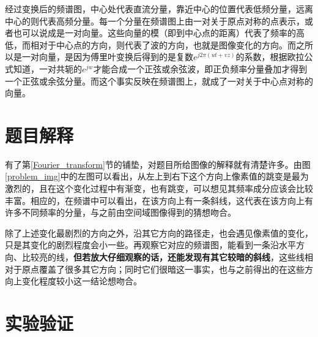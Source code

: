 \documentclass[UTF8]{ctexart}
\begin{document}
			 \indent 经过变换后的频谱图，中心处代表直流分量，靠近中心的位置代表低频分量，远离中心的则代表高频分量。每一个分量在频谱图上由一对关于原点对称的点表示，或者也可以说成是一对向量。这些向量的模（即到中心点的距离）代表了频率的高低，而相对于中心点的方向，则代表了波的方向，也就是图像变化的方向。而之所以是一对向量，是因为傅里叶变换后得到的是复数$e^{j2\pi(ut+vz)}$的系数，根据欧拉公式知道，一对共轭的$e^{jw}$才能合成一个正弦或余弦波，即正负频率分量叠加才得到一个正弦或余弦分量。而这个事实反映在频谱图上，就成了一对关于中心点对称的向量。



		
	\section{题目解释}\label{explanation}
		\indent 有了第\ref{Fourier_transform}节的铺垫，对题目所给图像的解释就有清楚许多。由图\ref{problem_img}中的左图可以看出，从左上到右下这个方向上像素值的跳变是最为激烈的，且在这个变化过程中有渐变，也有跳变，可以想见其频率成分应该会比较丰富。相应的，在频谱中可以看出，在该方向上有一条斜线，这代表在该方向上有许多不同频率的分量，与之前由空间域图像得到的猜想吻合。
        
        \indent 除了上述变化最剧烈的方向之外，沿其它方向的路径走，也会遇见像素值的变化，只是其变化的剧烈程度会小一些。再观察它对应的频谱图，能看到一条沿水平方向、比较亮的线，\textbf{但若放大仔细观察的话，还能发现有其它较暗的斜线}，这些线相对于原点覆盖了很多其它方向；同时它们很暗这一事实，也与之前得出的在这些方向上变化程度较小这一结论想吻合。
		
	\section{实验验证}
\end{document}
